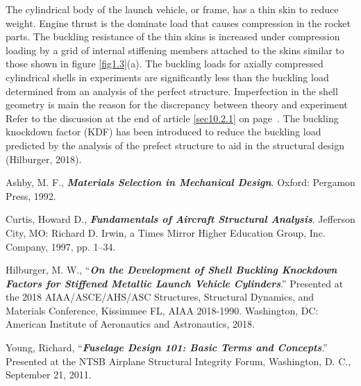\documentclass{AeroStructure-ERJohnson}
\begin{document}
The cylindrical body of the launch vehicle, or frame, has a thin skin to
reduce weight. Engine thrust is the dominate load that causes compression in
the rocket parts. The buckling resistance of the thin skins is increased
under compression loading by a grid of internal stiffening members attached
to the skins similar to those shown in
figure \ref{fig1.3}(a). The buckling loads for
axially compressed cylindrical shells in experiments are significantly less
than the buckling load determined from an analysis of the perfect structure.
Imperfection in the shell geometry is main the reason for the discrepancy
between theory and experiment Refer to the discussion at the end of article
\ref{sec10.2.1} on page~\pageref{sec10.2.1}. The buckling knockdown factor (KDF) has been introduced
to reduce the buckling load predicted by the analysis of the prefect
structure to aid in the structural design (Hilburger, 2018).

{\def\thefigure{1.6}
}


\begin{thebibliography}{}
\bibitem{}
Ashby, M. F., \textbf{\textit{Materials Selection in Mechanical Design}}.
Oxford: Pergamon Press, 1992.

\bibitem{}
Curtis, Howard D., \textbf{\textit{Fundamentals of Aircraft Structural
Analysis}}. Jefferson City, MO: Richard D. Irwin, a Times Mirror Higher
Education Group, Inc. Company, 1997, pp. 1--34.

\bibitem{}
Hilburger, M. W., ``\textbf{\textit{On the Development of Shell Buckling
Knockdown Factors for Stiffened Metallic Launch Vehicle Cylinders}}.''
Presented at the 2018 AIAA/ASCE/AHS/ASC Structures, Structural Dynamics, and
Materials Conference, Kissimmee FL, AIAA 2018-1990. Washington, DC: American
Institute of Aeronautics and Astronautics, 2018.

\bibitem{}
Young, Richard, ``\textbf{\textit{Fuselage Design 101: Basic Terms and
Concepts}}.'' Presented at the NTSB Airplane Structural Integrity Forum,
Washington, D. C., September 21, 2011.
\end{thebibliography}

\clearemptydoublepage
\end{document}
